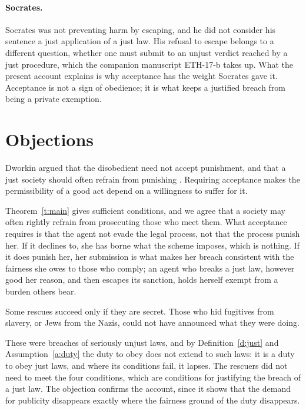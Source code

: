 \documentclass{situationist-preprint}
\begin{document}
\paragraph{Socrates.} Socrates was not preventing harm by escaping, and he did not consider his sentence a just application of a just law. His refusal to escape belongs to a different question, whether one must submit to an unjust verdict reached by a just procedure, which the companion manuscript ETH-17-b takes up. What the present account explains is why acceptance has the weight Socrates gave it. Acceptance is not a sign of obedience; it is what keeps a justified breach from being a private exemption.

\section{Objections}

\begin{objection}
Dworkin argued that the disobedient need not accept punishment, and that a just society should often refrain from punishing \citep[ch.~8]{Dworkin1977}. Requiring acceptance makes the permissibility of a good act depend on a willingness to suffer for it.
\end{objection}

\begin{reply}
Theorem~\ref{t:main} gives sufficient conditions, and we agree that a society may often rightly refrain from prosecuting those who meet them. What acceptance requires is that the agent not evade the legal process, not that the process punish her. If it declines to, she has borne what the scheme imposes, which is nothing. If it does punish her, her submission is what makes her breach consistent with the fairness she owes to those who comply; an agent who breaks a just law, however good her reason, and then escapes its sanction, holds herself exempt from a burden others bear.
\end{reply}

\begin{objection}
Some rescues succeed only if they are secret. Those who hid fugitives from slavery, or Jews from the Nazis, could not have announced what they were doing.
\end{objection}

\begin{reply}
These were breaches of seriously unjust laws, and by Definition~\ref{d:just} and Assumption~\ref{a:duty} the duty to obey does not extend to such laws: it is a duty to obey just laws, and where its conditions fail, it lapses. The rescuers did not need to meet the four conditions, which are conditions for justifying the breach of a just law. The objection confirms the account, since it shows that the demand for publicity disappears exactly where the fairness ground of the duty disappears.
\end{reply}
\end{document}
